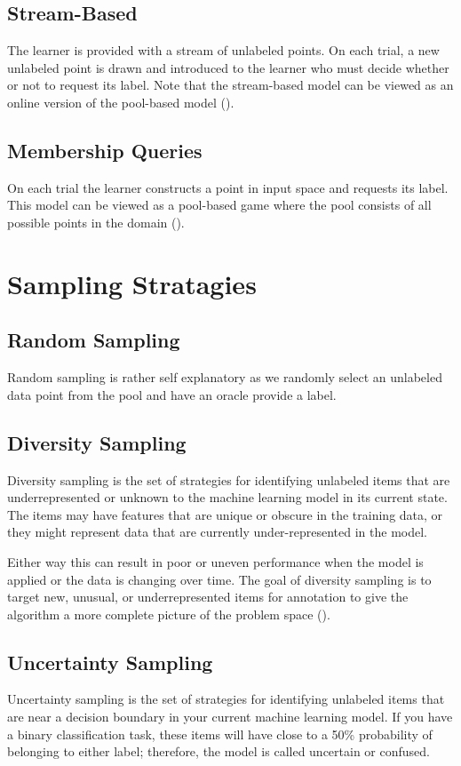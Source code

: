 \subsection{Stream-Based}
The learner is provided with a stream of unlabeled points. On each trial, a new unlabeled point is drawn and introduced to the learner who must decide whether or not to request its label. Note that the stream-based model can be viewed as an online version of the pool-based model (\cite{baram2004online}). 

\subsection{Membership Queries}
On each trial the learner constructs a point in input space and requests its label. This model can be viewed as a pool-based game where the pool consists of all possible points in the domain (\cite{baram2004online}).

\section{Sampling Stratagies}

\subsection{Random Sampling}
Random sampling is rather self explanatory as we randomly select an unlabeled data point from the pool and have an oracle provide a label.

\subsection{Diversity Sampling}
Diversity sampling is the set of strategies for identifying unlabeled items that are underrepresented or unknown to the machine learning model in its current state. The items may have features that are unique or obscure in the training data, or they might represent data that are currently under-represented in the model. 

Either way this can result in poor or uneven performance when the model is applied or the data is changing over time. The goal of diversity sampling is to target new, unusual, or underrepresented items for annotation to give the algorithm a more complete picture of the problem space (\cite{munro2021human}). 

\subsection{Uncertainty Sampling}
Uncertainty sampling is the set of strategies for identifying unlabeled items that are near a decision boundary in your current machine learning model. If you have a binary classification task, these items will have close to a 50\% probability of belonging to either label; therefore, the model is called uncertain or confused. 

